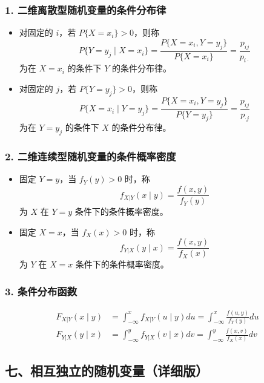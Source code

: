 \documentclass[12pt,a4paper]{ctexart}
\begin{document}
\subsubsection{1. 二维离散型随机变量的条件分布律}
\begin{itemize}[noitemsep]
    \item 对固定的 $i$，若 $P\{X = x_i\} > 0$，则称
          \[
              P\{Y = y_j \mid X = x_i\} = \frac{P\{X = x_i, Y = y_j\}}{P\{X = x_i\}} = \frac{p_{ij}}{p_{i\cdot}}
          \]
          为在 $X = x_i$ 的条件下 $Y$ 的条件分布律。
    \item 对固定的 $j$，若 $P\{Y = y_j\} > 0$，则称
          \[
              P\{X = x_i \mid Y = y_j\} = \frac{P\{X = x_i, Y = y_j\}}{P\{Y = y_j\}} = \frac{p_{ij}}{p_{\cdot j}}
          \]
          为在 $Y = y_j$ 的条件下 $X$ 的条件分布律。
\end{itemize}

\subsubsection{2. 二维连续型随机变量的条件概率密度}
\begin{itemize}[noitemsep]
    \item 固定 $Y = y$，当 $f_Y(y) > 0$ 时，称
          \[
              f_{X|Y}(x \mid y) = \frac{f(x, y)}{f_Y(y)}
          \]
          为 $X$ 在 $Y = y$ 条件下的条件概率密度。
    \item 固定 $X = x$，当 $f_X(x) > 0$ 时，称
          \[
              f_{Y|X}(y \mid x) = \frac{f(x, y)}{f_X(x)}
          \]
          为 $Y$ 在 $X = x$ 条件下的条件概率密度。
\end{itemize}

\subsubsection{3. 条件分布函数}
\begin{align*}
    F_{X|Y}(x \mid y) & = \int_{-\infty}^x f_{X|Y}(u \mid y) du = \int_{-\infty}^x \frac{f(u, y)}{f_Y(y)} du \\
    F_{Y|X}(y \mid x) & = \int_{-\infty}^y f_{Y|X}(v \mid x) dv = \int_{-\infty}^y \frac{f(x, v)}{f_X(x)} dv
\end{align*}

\subsection{七、相互独立的随机变量（详细版）}
\end{document}
